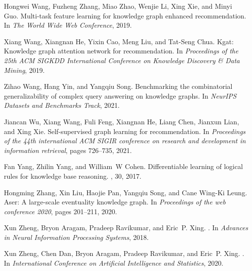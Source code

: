 \documentclass[11pt]{article}
\begin{document}
\begin{thebibliography}{10}
Hongwei Wang, Fuzheng Zhang, Miao Zhao, Wenjie Li, Xing Xie, and Minyi Guo.
\newblock Multi-task feature learning for knowledge graph enhanced
  recommendation.
\newblock In {\em The World Wide Web Conference}, 2019.

Xiang Wang, Xiangnan He, Yixin Cao, Meng Liu, and Tat-Seng Chua.
\newblock Kgat: Knowledge graph attention network for recommendation.
\newblock In {\em Proceedings of the 25th ACM SIGKDD International Conference
  on Knowledge Discovery \& Data Mining}, 2019.

Zihao Wang, Hang Yin, and Yangqiu Song.
\newblock Benchmarking the combinatorial generalizability of complex query
  answering on knowledge graphs.
\newblock In {\em NeurIPS Datasets and Benchmarks Track}, 2021.

Jiancan Wu, Xiang Wang, Fuli Feng, Xiangnan He, Liang Chen, Jianxun Lian, and
  Xing Xie.
\newblock Self-supervised graph learning for recommendation.
\newblock In {\em Proceedings of the 44th international ACM SIGIR conference on
  research and development in information retrieval}, pages 726--735, 2021.

Fan Yang, Zhilin Yang, and William~W Cohen.
\newblock Differentiable learning of logical rules for knowledge base
  reasoning.
, 30, 2017.

Hongming Zhang, Xin Liu, Haojie Pan, Yangqiu Song, and Cane Wing-Ki Leung.
\newblock Aser: A large-scale eventuality knowledge graph.
\newblock In {\em Proceedings of the web conference 2020}, pages 201--211,
  2020.

Xun Zheng, Bryon Aragam, Pradeep Ravikumar, and Eric~P. Xing.
.
\newblock In {\em Advances in Neural Information Processing Systems}, 2018.

Xun Zheng, Chen Dan, Bryon Aragam, Pradeep Ravikumar, and Eric~P. Xing.
.
\newblock In {\em International Conference on Artificial Intelligence and
  Statistics}, 2020.

\end{thebibliography}
\end{document}
